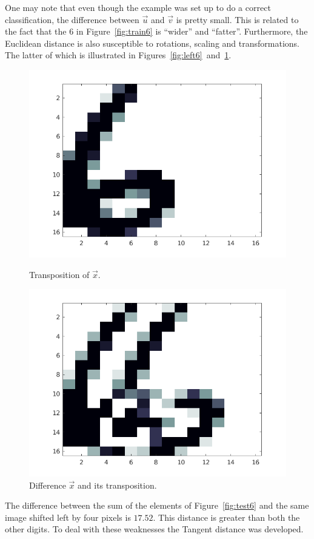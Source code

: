 One may note that even though the example was set up to do a correct classification, the difference between \(\vec{u}\) and \(\vec{v}\) is pretty small.
This is related to the fact that the 6 in Figure~\ref{fig:train6} is ``wider'' and ``fatter''.
Furthermore, the Euclidean distance is also susceptible to rotations, scaling and transformations.
The latter of which is illustrated in Figures~\ref{fig:left6}~and~\ref{fig:differenc6left6}.
\begin{figure}[H]
    \centering
    \begin{minipage}{.45\textwidth}
        \centering
        \includegraphics[width = 0.8\linewidth]{images/knn/left6.png}
        \caption{Transposition of \(\vec{x}\).}\label{fig:left6}
    \end{minipage}
    \begin{minipage}{.45\textwidth}
        \centering
        \includegraphics[width = 0.8\linewidth]{images/knn/difference6left6.png}
        \caption{Difference \(\vec{x}\) and its transposition.}\label{fig:differenc6left6}
    \end{minipage}
\end{figure}
The difference between the sum of the elements of Figure~\ref{fig:test6} and the same image shifted left by four pixels is \(17.52\).
This distance is greater than both the other digits.
To deal with these weaknesses the Tangent distance was developed.


